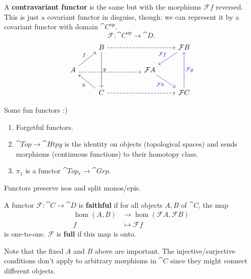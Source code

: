 \documentclass[twoside,10pt]{report}
\DeclareMathOperator{\op}{op}
\begin{document}
A \textbf{contravariant functor} is the same but with the morphisms $\mathcal{F} f$ reversed. This is just a covariant functor in disguise, though: we can represent it by a covariant functor with domain $\cat{C}^{\op}$.
\[
	\mathcal{F}: \cat{C}^{\op}\to \cat{D}.
\]
\[
\begin{tikzcd}                                                   & B \arrow[dd, "g"] \arrow[rrr, dashed] &  &                                           & \mathcal{F}B \arrow[dl, blue, "\mathcal{F}f"'] \\A \arrow[ru, "f"] \arrow[rrr, dashed, shift right] &                                       &  & \mathcal{F}A \arrow[dr, blue, "\mathcal{F}h"'] &                                           \\                                                   & C \arrow[lu, "h"] \arrow[rrr, dashed] &  &                                           & \mathcal{F}C \arrow[uu, blue, "\mathcal{F}g"']
\end{tikzcd}
\]

\begin{ex}[]
Some fun functors :)
\begin{enumerate}
	\item Forgetful functors.
	\item $\cat{Top}\to \cat{Htpy}$ is the identity on objects (topological spaces) and sends morphisms (continuous functions) to their homotopy class.
	\item $\pi_1$ is a functor $\cat{Top}_{*}\to \cat{Grp}$.
\end{enumerate}
\end{ex}

\begin{prop}
Functors preserve isos and split monos/epis.
\end{prop}

\begin{defn}
A functor $\mathcal{F}:\cat{C}\to \cat{D}$ is \textbf{faithful} if for all objects $A,B$ of $\cat{C}$, the map
\begin{align*}
	\hom(A,B) &\to \hom(\mathcal{F}A, \mathcal{F}B) \\
	f &\mapsto \mathcal{F}f
\end{align*} is one-to-one. $\mathcal{F}$ is \textbf{full} if this map is onto.
\end{defn}

Note that the fixed $A$ and $B$ above are important. The injective/surjective conditions don't apply to arbitrary morphisms in $\cat{C}$ since they might connect different objects.
\end{document}
